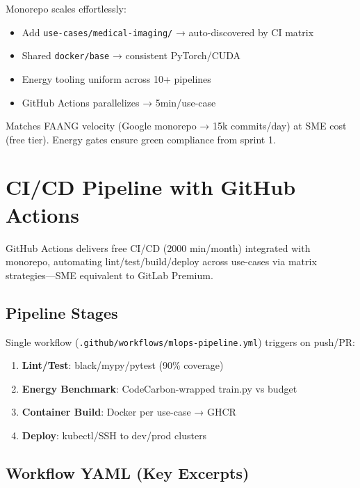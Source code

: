 Monorepo scales effortlessly:
\begin{itemize}
    \item Add \texttt{use-cases/medical-imaging/} → auto-discovered by CI matrix
    \item Shared \texttt{docker/base} → consistent PyTorch/CUDA
    \item Energy tooling uniform across 10+ pipelines
    \item GitHub Actions parallelizes → 5min/use-case
\end{itemize}

Matches FAANG velocity (Google monorepo → 15k commits/day) at SME cost (free tier). Energy gates ensure green compliance from sprint 1.\@


\section{CI/CD Pipeline with GitHub Actions}

GitHub Actions delivers free CI/CD (2000 min/month) integrated with monorepo, automating lint/test/build/deploy across use-cases via matrix strategies—SME equivalent to GitLab Premium.

\subsection{Pipeline Stages}

Single workflow (\texttt{.github/workflows/mlops-pipeline.yml}) triggers on push/PR:\@

\begin{enumerate}
    \item \textbf{Lint/Test}: black/mypy/pytest (90\% coverage)
    \item \textbf{Energy Benchmark}: CodeCarbon-wrapped train.py vs budget
    \item \textbf{Container Build}: Docker per use-case → GHCR
    \item \textbf{Deploy}: kubectl/SSH to dev/prod clusters
\end{enumerate}

\subsection{Workflow YAML (Key Excerpts)}

